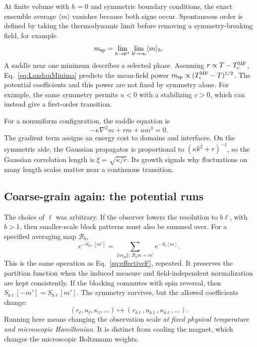 \documentclass[11pt]{article}
\begin{document}
At finite volume with \(h=0\) and symmetric boundary conditions, the exact
ensemble average \(\langle m\rangle\) vanishes because both signs occur.
Spontaneous order is defined by taking the thermodynamic limit before
removing a symmetry-breaking field, for example
\begin{equation}
m_{\rm sp}=\lim_{h\to0^+}\lim_{\mathcal V\to\infty}
\langle m\rangle_h.
\end{equation}
A saddle near one minimum describes a selected phase. Assuming
\(r\propto T-T_c^{\rm MF}\), Eq.~\eqref{eq:LandauMinima} predicts the
mean-field power \(m_{\rm sp}\propto(T_c^{\rm MF}-T)^{1/2}\).
The potential coefficients and this power are not fixed by symmetry alone.
For example, the same symmetry permits \(u<0\) with a stabilizing
\(v>0\), which can instead give a first-order transition.

For a nonuniform configuration, the saddle equation is
\begin{equation}
-\kappa\nabla^2m+rm+um^3=0.
\label{eq:statSaddle}
\end{equation}
The gradient term assigns an energy cost to domains and interfaces. On the
symmetric side, the Gaussian propagator is proportional to
\((\kappa k^2+r)^{-1}\), so the Gaussian correlation length is
\(\xi=\sqrt{\kappa/r}\). Its growth signals why fluctuations on many
length scales matter near a continuous transition.

\subsection{Coarse-grain again: the potential runs}

The choice of \(\ell\) was arbitrary. If the observer lowers the resolution
to \(b\ell\), with \(b>1\), then smaller-scale block patterns must also be
summed over. For a specified averaging map \(\mathcal B_b\),
\begin{equation}
e^{-S_{b\ell}[m']}=
\sum_{\{m_B\}:\,\mathcal B_bm=m'}e^{-S_\ell[m]}.
\label{eq:RGblocking}
\end{equation}
This is the same operation as Eq.~\eqref{eq:effectiveF}, repeated.
It preserves the partition function when the induced measure and
field-independent normalization are kept consistently. If the blocking
commutes with spin reversal, then \(S_{b\ell}[-m']=S_{b\ell}[m']\).
The symmetry survives, but the allowed coefficients change:
\begin{equation}
(r_\ell,u_\ell,\kappa_\ell,\ldots)
\longmapsto(r_{b\ell},u_{b\ell},\kappa_{b\ell},\ldots).
\end{equation}
Running here means changing the observation scale \emph{at fixed physical
temperature and microscopic Hamiltonian}. It is distinct from cooling the
magnet, which changes the microscopic Boltzmann weights.
\end{document}
